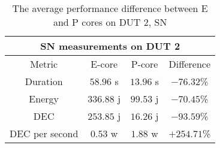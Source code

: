 \begin{table}[H]
    \centering
    \begin{tabular}{|| c | c | c | c ||}
    \hline
    \multicolumn{4}{||c||}{SN measurements on DUT 2} \\ [0.5ex] \hline\hline
    Metric & E-core & P-core & Difference \\\hline
    Duration & $58.96$ s & $13.96$ s & $-76.32$\% \\
    Energy & $336.88$ j & $99.53$ j & $-70.45$\% \\
    DEC & $253.85$ j & $16.26$ j & $-93.59$\% \\
    DEC per second & $0.53$ w & $1.88$ w & $+254.71$\% \\\hline
    \end{tabular}
    \caption{The average performance difference between E and P cores on DUT 2, SN}
    \label{tab:dut-2-exp-3-sn}
\end{table}













